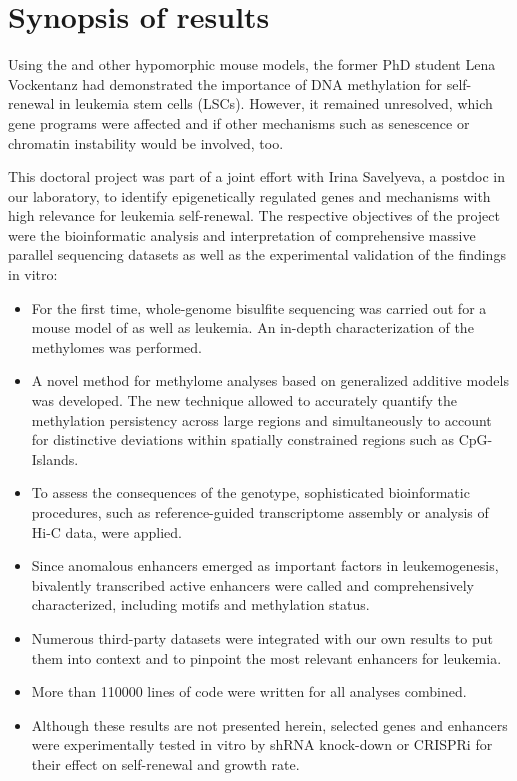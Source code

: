 \chapter{Synopsis of results}
\label{chap:d:tng}\vspace{-2em}

Using the \dnmtchip and other hypomorphic  mouse models, the former PhD student Lena Vockentanz had demonstrated the importance of DNA methylation for self-renewal in leukemia stem cells (LSCs)\cite{Vockentanz2011}.  However, it remained unresolved, which gene programs were affected and if other mechanisms such as senescence or chromatin instability would be involved, too.  

This doctoral project was part of a joint effort with Irina Savelyeva, a postdoc in our laboratory, to identify epigenetically regulated genes and mechanisms with high relevance for leukemia self-renewal. The respective objectives of the project were the bioinformatic analysis and interpretation of comprehensive massive parallel sequencing datasets as well as the experimental validation of the findings in vitro:

\begin{itemize}
	\item For the first time, whole-genome bisulfite sequencing was carried out for a mouse model of \dnmtwt as well as \dnmtchip \mllafnine leukemia. An in-depth characterization of the methylomes was performed.
	\item A novel method for methylome analyses based on generalized additive models was developed. The new technique allowed to accurately quantify the methylation persistency across large regions and simultaneously to account for distinctive deviations within spatially constrained regions such as CpG-Islands. 
	\item To assess the consequences of the \dnmtchip genotype, sophisticated bioinformatic procedures, such as reference-guided transcriptome assembly or analysis of Hi-C data, were applied.
	\item Since anomalous enhancers emerged as important factors in leukemogenesis, bivalently transcribed active enhancers were called and comprehensively characterized, including motifs and methylation status.
	\item Numerous third-party datasets were integrated with our own results to put them into context and to pinpoint the most relevant enhancers for \mllafnine leukemia.
	\item More than \num{110000} lines of code were written for all analyses combined.  
	\item Although these results are not presented herein, selected genes and enhancers were experimentally tested in vitro by shRNA knock-down or CRISPRi for their effect on self-renewal and growth rate.
\end{itemize}
